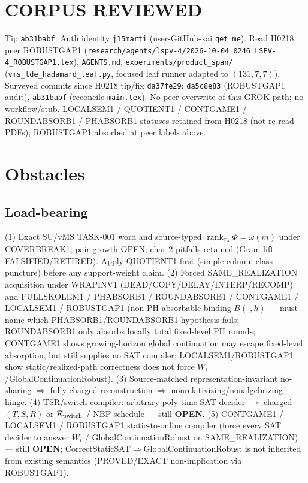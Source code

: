 \documentclass[11pt]{article}
\begin{document}
\section*{CORPUS REVIEWED}
Tip \texttt{ab31babf}. Auth identity \texttt{j15marti} (user-GitHub-xai \texttt{get\_me}).
Read H0218, peer ROBUSTGAP1
(\texttt{research/agents/lspv-4/2026-10-04\_0246\_LSPV-4\_ROBUSTGAP1.tex}),
\texttt{AGENTS.md}, \texttt{experiments/product\_span/}
(\texttt{vms\_lde\_hadamard\_leaf.py}, focused leaf runner adapted to $(131,7,7)$).
Surveyed commits since H0218 tip/fix \texttt{da37fe29}:
\texttt{da5c8e83} (ROBUSTGAP1 audit), \texttt{ab31babf} (reconcile \texttt{main.tex}).
No peer overwrite of this GROK path; no workflow/stub.
LOCALSEM1 / QUOTIENT1 / CONTGAME1 / ROUNDABSORB1 / PHABSORB1 statuses retained from H0218
(not re-read PDFs); ROBUSTGAP1 absorbed at peer labels above.

\section*{Obstacles}
\subsection*{Load-bearing}
(1) Exact SU/vMS TASK-001 word and source-typed
$\operatorname{rank}_{\mathbb F_2}\Phi=\omega(m)$ under COVERBREAK1; pair-growth OPEN;
char-$2$ pitfalls retained (Gram lift FALSIFIED/RETIRED). Apply QUOTIENT1 first
(simple column-class puncture) before any support-weight claim.
(2) Forced SAME\_REALIZATION acquisition under WRAPINV1
(DEAD/COPY/DELAY/INTERP/RECOMP) and FULLSKOLEM1 / PHABSORB1 / ROUNDABSORB1 / CONTGAME1 /
LOCALSEM1 / ROBUSTGAP1
(non-PH-absorbable binding $B(\cdot,h)$ --- must name which PHABSORB1/ROUNDABSORB1
hypothesis fails; ROUNDABSORB1 only absorbs locally total fixed-level PH rounds;
CONTGAME1 shows growing-horizon global continuation may escape fixed-level absorption,
but still supplies no SAT compiler; LOCALSEM1/ROBUSTGAP1 show static/realized-path
correctness does not force $W_i$/GlobalContinuationRobust).
(3) Source-matched representation-invariant no-sharing $\Rightarrow$ fully charged reconstruction
$\Rightarrow$ nonrelativizing/nonalgebrizing hinge.
(4) TSR/switch compiler: arbitrary poly-time SAT decider $\to$ charged $(T,S,R)$ or
$\mathcal R_{\rm switch}$ / NBP schedule --- still \textbf{OPEN}.
(5) CONTGAME1 / LOCALSEM1 / ROBUSTGAP1 static-to-online compiler (force every SAT decider to
answer $W_i$ / GlobalContinuationRobust on SAME\_REALIZATION) --- still \textbf{OPEN};
CorrectStaticSAT$\Rightarrow$GlobalContinuationRobust is not inherited from existing semantics
(PROVED/EXACT non-implication via ROBUSTGAP1).
\end{document}
